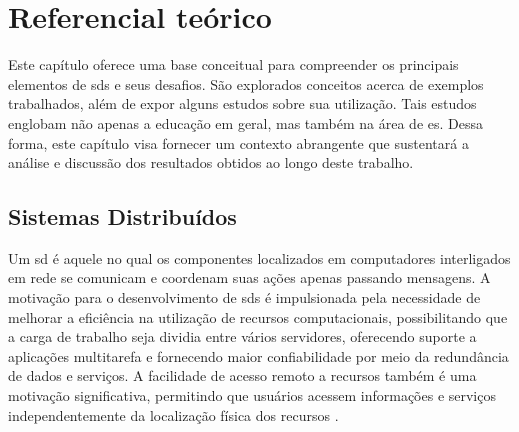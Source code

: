 
\chapter{Referencial teórico}
\label{cap:referencialTeorico}

Este capítulo oferece uma base conceitual para compreender os principais elementos de \gls{sds} e seus desafios. São explorados conceitos acerca de exemplos trabalhados, além de expor alguns estudos sobre sua utilização. Tais estudos englobam não apenas a educação em geral, mas também na área de \gls{es}. Dessa forma, este capítulo visa fornecer um contexto abrangente que sustentará a análise e discussão dos resultados obtidos ao longo deste trabalho.

\section{Sistemas Distribuídos}
\label{section:sistemasDistribuidos}

Um \gls{sd} é aquele no qual os componentes localizados em computadores interligados em rede se comunicam e coordenam suas ações apenas passando mensagens. A motivação para o desenvolvimento de \gls{sds} é impulsionada pela necessidade de melhorar a eficiência na utilização de recursos computacionais, possibilitando que a carga de trabalho seja dividia entre vários servidores, oferecendo suporte a aplicações multitarefa e fornecendo maior confiabilidade por meio da redundância de dados e serviços. A facilidade de acesso remoto a recursos também é uma motivação significativa, permitindo que usuários acessem informações e serviços independentemente da localização física dos recursos \cite{TanenbaumDistributedSystemsThirdEdition}.


